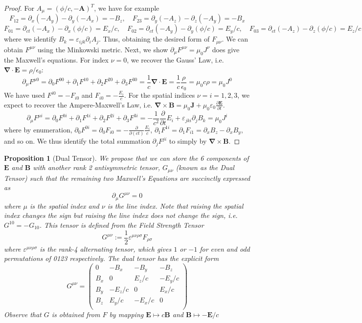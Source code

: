 \documentclass[a4paper]{article}
\theoremstyle{new}
\newtheorem{prop}{Proposition}[section]
\begin{document}
\begin{proof}
For $A_\mu=(\phi/c,-\mathbf{A})^T$, we have for example
$$F_{12}=\partial_x(-A_y)-\partial_y(-A_x)=-B_z,\quad F_{23}=\partial_y(-A_z)-\partial_z(-A_y)=-B_x$$
$$F_{01}=\partial_{ct}(-A_x)-\partial_x(\phi/c)=E_x/c,\quad
F_{02}=\partial_{ct}(-A_y)-\partial_y(\phi/c)=E_y/c,\quad F_{03}=\partial_{ct}(-A_z)-\partial_z(\phi/c)=E_z/c$$
where we identify $B_k=\varepsilon_{ijk}\partial_iA_j$. 
Thus, obtaining the desired form of $F_{\mu\nu}$. We can obtain $F^{\mu\nu}$ using the Minkowski metric. Next, we show $\partial_\mu F^{\mu\nu}=\mu_0J^\nu$ does give the Maxwell's equations. For index $\nu=0$, we recover the Gauss' Law, i.e. $\boldsymbol{\nabla}\cdot\mathbf{E}=\rho/\epsilon_0$:
$$\partial_\mu F^{\mu0}=\partial_0F^{00}+\partial_1F^{10}+\partial_2F^{20}+\partial_3F^{30}=\frac{1}{c}\boldsymbol{\nabla}\cdot\mathbf{E}=\frac{1}{c}\frac{\rho}{\epsilon_0}=\mu_0c\rho=\mu_0J^0$$
We have used $F^{i0}=-F_{i0}$ and  $F_{i0}=-\frac{E_i}{c}$. For the spatial indices $\nu=i=1,2,3$, we expect to recover the Ampere-Maxwell's Law, i.e. $\boldsymbol{\nabla}\times\mathbf{B}=\mu_0\mathbf{J}+\mu_0\varepsilon_0\frac{\partial\mathbf{E}}{\partial t}$.
$$\partial_\mu F^{\mu i}=\partial_0F^{0i}+\partial_1F^{1i}+\partial_2F^{2i}+\partial_3F^{3i}=-\frac{1}{c^2}\frac{\partial}{\partial t}E_i+\varepsilon_{jki}\partial_jB_k=\mu_0J^i$$
where by enumeration, $\partial_0F^{0i}=\partial_0F_{i0}=-\frac{\partial}{\partial(ct)}\frac{E_i}{c}$, $\partial_1F^{1i}=\partial_1F_{i1}=\partial_xB_z-\partial_xB_y$, and so on. We thus identify the total summation $\partial_jF^{ji}$ to simply by $\boldsymbol{\nabla}\times\mathbf{B}$.
\end{proof}
\begin{prop}[Dual Tensor]
We propose that we can store the 6 components of $\mathbf{E}$ and $\mathbf{B}$ with another rank 2 antisymmetric tensor, $G_{\mu\nu}$ (known as the Dual Tensor) such that the remaining two Maxwell's Equations are succinctly expressed as
$$\partial_\mu G^{\mu\nu}=0$$
where $\mu$ is the spatial index and $\nu$ is the line index. Note that raising the spatial index changes the sign but raising the line index does not change the sign, i.e. $G^{10}=-G_{10}$. This tensor is defined from the Field Strength Tensor
$$G^{\mu\nu}:=\frac{1}{2}\varepsilon^{\mu\nu\rho\sigma}F_{\rho\sigma}$$
where $\varepsilon^{\mu\nu\rho\sigma}$ is the rank-4 alternating tensor, which gives $1$ or $-1$ for even and odd permutations of 0123 respectively. The dual tensor has the explicit form
$$G^{\mu\nu}=\begin{pmatrix}0&-B_x&-B_y&-B_z\\B_x&0&E_z/c&-E_y/c\\B_y&-E_z/c&0&E_x/c\\B_z&E_y/c&-E_x/c&0\\\end{pmatrix}$$
Observe that $G$ is obtained from $F$ by mapping $\mathbf{E}\mapsto c\mathbf{B}$ and $\mathbf{B}\mapsto -\mathbf{E}/c$
\end{prop}
\end{document}
